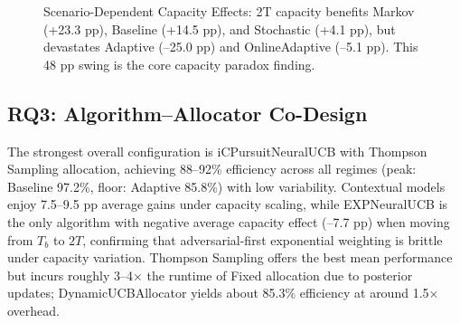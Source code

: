 \documentclass[11pt,a4paper]{article}
\begin{document}
\begin{figure}[tb]
\centering
{}
\caption{Scenario-Dependent Capacity Effects: 2T capacity benefits Markov (+23.3 pp), Baseline (+14.5 pp), and Stochastic (+4.1 pp), but devastates Adaptive (--25.0 pp) and OnlineAdaptive (--5.1 pp). This 48 pp swing is the core capacity paradox finding.}
\label{fig:scenario_capacity_effects}
\end{figure}

\subsection{RQ3: Algorithm--Allocator Co-Design}

The strongest overall configuration is iCPursuitNeuralUCB with Thompson Sampling allocation, achieving 88--92\% efficiency across all regimes (peak: Baseline 97.2\%, floor: Adaptive 85.8\%) with low variability. Contextual models enjoy 7.5--9.5 pp average gains under capacity scaling, while EXPNeuralUCB is the only algorithm with negative average capacity effect (--7.7 pp) when moving from $T_b$ to $2T$, confirming that adversarial-first exponential weighting is brittle under capacity variation. Thompson Sampling offers the best mean performance but incurs roughly 3--4× the runtime of Fixed allocation due to posterior updates; DynamicUCBAllocator yields about 85.3\% efficiency at around 1.5× overhead.
\end{document}
